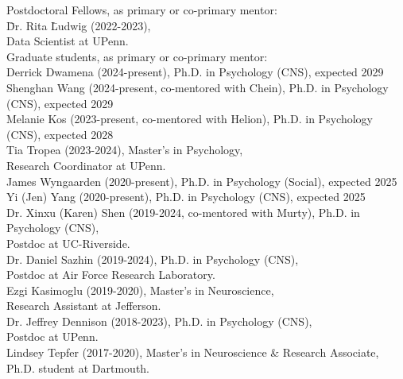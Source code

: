 \documentclass[11pt, letterpaper]{article}
\begin{document}
\begin{tabbing}
Postdoctoral Fellows, as primary or co-primary mentor: \\  [.1cm]
\hspace{.5in} \= Dr. Rita \= Ludwig (2022-2023), \\ 
\> \> Data Scientist at UPenn. \\ [.2cm]

Graduate students, as primary or co-primary mentor: \\  [.1cm]
\> Derrick Dwamena (2024-present), Ph.D. in Psychology (CNS), expected 2029 \\ 
\> Shenghan Wang (2024-present, co-mentored with Chein), Ph.D. in Psychology (CNS), expected 2029 \\ 
\> Melanie Kos (2023-present, co-mentored with Helion), Ph.D. in Psychology (CNS), expected 2028 \\ 
\> Tia Tropea (2023-2024), Master's in Psychology, \\ 
\> \> Research Coordinator at UPenn. \\ 
\> James Wyngaarden (2020-present), Ph.D. in Psychology (Social), expected 2025 \\
\> Yi (Jen) Yang (2020-present), Ph.D. in Psychology (CNS), expected 2025 \\
\> Dr. Xinxu (Karen) Shen (2019-2024, co-mentored with Murty), Ph.D. in Psychology (CNS), \\
\> \> Postdoc at UC-Riverside. \\ 
\> Dr. Daniel Sazhin (2019-2024), Ph.D. in Psychology (CNS), \\
\> \> Postdoc at Air Force Research Laboratory. \\ 
\> Ezgi Kasimoglu (2019-2020), Master's in Neuroscience, \\ 
\> \> Research Assistant at Jefferson. \\
\> Dr. Jeffrey Dennison (2018-2023), Ph.D. in Psychology (CNS), \\
\> \> Postdoc at UPenn. \\ 
\> Lindsey Tepfer (2017-2020), Master's in Neuroscience \& Research Associate, \\
\> \> Ph.D. student at Dartmouth. \\ [.2cm]


\end{tabbing}
\end{document}
